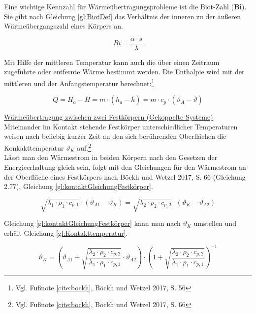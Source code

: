 Eine wichtige Kennzahl für Wärmeübertragungsprobleme ist die Biot-Zahl (\textbf{Bi}). Sie gibt nach Gleichung \ref{gl:BiotDef} das Verhältnis der inneren zu der äußeren Wärmeübergangszahl eines Körpers an.

\begin{equation}
	Bi = \frac{\alpha \cdot s}{\lambda} \label{gl:BiotDef}
\end{equation}

Mit Hilfe der mittleren Temperatur kann auch die über einen Zeitraum zugeführte oder entfernte Wärme bestimmt werden. Die Enthalpie wird mit der mittleren und der Anfangstemperatur berechnet:\footnote{Vgl. Fußnote \ref{cite:bockh}, Böckh und Wetzel 2017, S. 56}

\begin{equation}
	Q = H_{a} - \overline{H} = m \cdot (h_{a} - \overline{h}) = m \cdot c_{p} \cdot (\vartheta_{A} - \overline{\vartheta}) \label{gl:gesamtWaermeUebertragen}
\end{equation}

\underline{Wärmeübertragung zwischen zwei Festkörpern (Gekoppelte Systeme)}
\\

Miteinander im Kontakt stehende Festkörper unterschiedlicher Temperaturen weisen nach beliebig kurzer Zeit an den sich berührenden Oberflächen die Konkakttemperatur $\vartheta_{K}$ auf.\footnote{Vgl. Fußnote \ref{cite:bockh}, Böckh und Wetzel 2017, S. 66} \\
Lässt man den Wärmestrom in beiden Körpern nach den Gesetzen der Energieerhaltung gleich sein, folgt mit den Gleichungen für den Wärmestrom an der Oberfläche eines Festkörpers nach Böckh und Wetzel 2017, S. 66 (Gleichung 2.77), Gleichung \ref{gl:kontaktGleichungFestkörper}.

\begin{equation}
	\sqrt{\lambda_{1} \cdot \rho_{1} \cdot c_{p,1}} \cdot (\vartheta_{A1} - \vartheta_{K}) = \sqrt{\lambda_{2} \cdot \rho_{2} \cdot c_{p,2}} \cdot (\vartheta_{K} - \vartheta_{A2}) \label{gl:kontaktGleichungFestkörper}
\end{equation}

Gleichung \ref{gl:kontaktGleichungFestkörper} kann man nach $\vartheta_{K}$ umstellen und erhält Gleichung \ref{gl:Kontakttemperatur}.

\begin{equation}
	\vartheta_{K} = \left( \vartheta_{A1} + \sqrt{\frac{\lambda_{2} \cdot \rho_{2} \cdot c_{p,2}}{\lambda_{1} \cdot \rho_{1} \cdot c_{p,1}}} \cdot \vartheta_{A2} \right) \cdot \left( 1 + \sqrt{\frac{\lambda_{2} \cdot \rho_{2} \cdot c_{p,2}}{\lambda_{1} \cdot \rho_{1} \cdot c_{p,1}}} \right)^{-1} \label{gl:Kontakttemperatur}
\end{equation}
 
